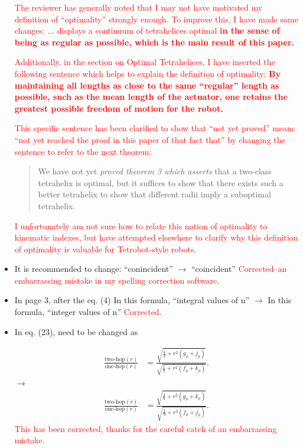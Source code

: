 \documentclass{article}
\newcommand{\highlighttext}[1] {\textcolor{red}{#1}}
\begin{document}
\begin{itemize}
\highlighttext{
  The reviewer has generally noted that I may not have motivated my definition of ``optimality''
  strongly enough. To improve this, I have made some changes:
... displays a continuum of tetrahelices optimal \bf{
  in the sense of being
as regular as possible},
which is the main result of this
paper.
}

\highlighttext{
  Additionally, in the section on Optimal Tetrahelices, I have inserted the following sentence which helps to
  explain the definition of optimality:
  \bf{By maintaining all lengths as close to the same ``regular'' length as possible,
such as the mean length of the actuator,
one retains the greatest possible freedom of motion for the robot.}
  }

\highlighttext{This specific sentence has been clarified to show that ``not yet proved'' means
  ``not yet reached the proof in this paper of that fact that'' by changing the sentence to refer
  to the next theorem:
  \begin{quote}
  We have not yet {\em
proved theorem 3 which asserts} that a two-class tetrahelix is optimal, but it suffices to show that there
exists such a better tetrahelix to show that different radii imply a suboptimal
tetrahelix.
  \end{quote}
  I unfortunately am not sure how to relate this notion of optimality to kinematic indexes, but
  have attempted elsewhere to clarify why this definition of optimality is valuable for
  Tetrobot-style robots.
  }
\item 
 It is recommended to change:
 ``conincident'' $\rightarrow$ ``coincident''
 \highlighttext{Corrected--an embarrassing mistake in my spelling correction software.}
\item In page 3, after the eq. (4)
  In this formula, ``integral values of n'' $\rightarrow$ In this formula, ``integer values of n''
  \highlighttext{Corrected.}
  \item 
In eq. (23), need to be changed as

\begin{equation}
  \begin{split}
  \frac{\text{two-hop}(r)}{ \text{one-hop}(r)}  &=
  \frac{\sqrt{\frac{4}{9}  + r^2(g_{\rho}+ j_{\rho})}}
       {\sqrt{\frac{1}{9} +r^2(f_{\rho}+k_{\rho}) }} \text{.}
  \end{split}       
\end{equation}
$\rightarrow$ 
\begin{equation}
  \begin{split}
  \frac{\text{two-hop}(r)}{ \text{one-hop}(r)}  &=
  \frac{\sqrt{\frac{4}{9}  + r^2(g_{\rho}+ k_{\rho})}}
       {\sqrt{\frac{1}{9} +r^2(f_{\rho}+j_{\rho}) }} \text{.}
  \end{split}       
\end{equation}
\highlighttext{This has been corrected, thanks for the careful catch of an embarrassing mistake.}


\end{itemize}
\end{document}
